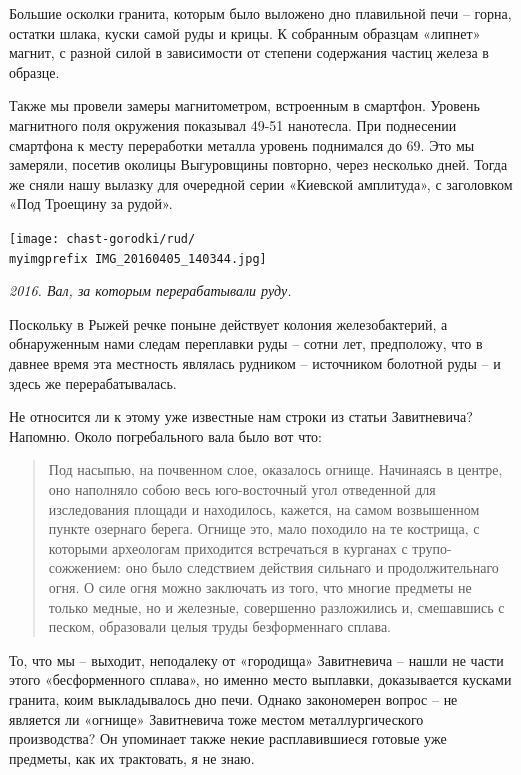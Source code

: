 \newpage

Большие осколки гранита, которым было выложено дно плавильной печи – горна, остатки шлака, куски самой руды и крицы. К собранным образцам «липнет» магнит, с разной силой в зависимости от степени содержания частиц железа в образце.

Также мы провели замеры магнитометром, встроенным в смартфон. Уровень магнитного поля окружения показывал 49-51 нанотесла. При поднесении смартфона к месту переработки металла уровень поднимался до 69. Это мы замеряли, посетив  околицы Выгуровщины повторно, через несколько дней. Тогда же сняли нашу вылазку для очередной серии «Киевской амплитуда», с заголовком «Под Троещину за рудой».

\begin{center}
\texttt{[image: chast-gorodki/rud/\\myimgprefix IMG\_20160405\_140344.jpg]}

\textit{2016. Вал, за которым перерабатывали руду.}
\end{center}

Поскольку в Рыжей речке поныне действует колония железобактерий, а обнаруженным нами следам переплавки руды – сотни лет, предположу, что в давнее время эта местность являлась рудником – источником болотной руды – и здесь же перерабатывалась. 

Не относится ли к этому уже известные нам строки из статьи Завитневича? Напомню. Около погребального вала было вот что:

\begin{quotation}
Под насыпью, на почвенном слое, оказалось огнище. Начинаясь в центре, оно наполняло собою весь юго-восточный угол отведенной для изследования площади и находилось, кажется, на самом возвышенном пункте озернаго берега. Огнище это, мало походило на те кострища, с которыми археологам приходится встречаться в курганах с трупо-сожжением: оно было следствием действия сильнаго и продолжительнаго огня. О силе огня можно заключать из того, что многие предметы не только медные, но и железные, совершенно разложились и, смешавшись с песком, образовали целыя труды безформеннаго сплава. 
\end{quotation}

То, что мы – выходит, неподалеку от «городища» Завитневича – нашли не части этого «бесформенного сплава», но именно место выплавки, доказывается кусками гранита, коим выкладывалось дно печи. Однако закономерен вопрос – не является ли «огнище» Завитневича тоже местом металлургического производства? Он упоминает также некие расплавившиеся готовые уже предметы, как их трактовать, я не знаю.


